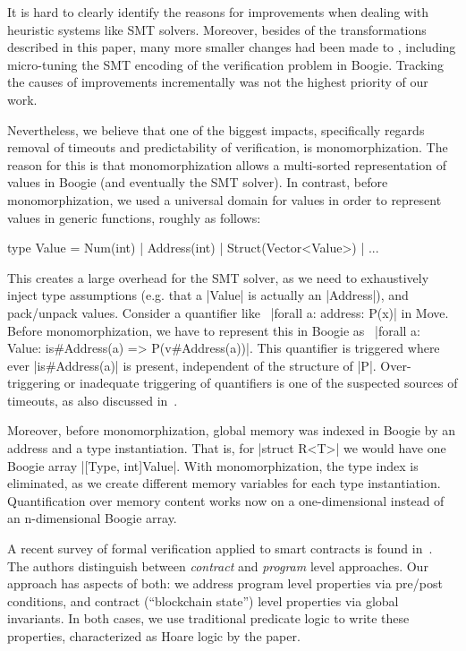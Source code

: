 
It is hard to clearly identify the reasons for improvements when dealing with
heuristic systems like SMT solvers. Moreover, besides of the transformations
described in this paper, many more smaller changes had been made to \MVP,
including micro-tuning the SMT encoding of the verification problem in
Boogie. Tracking the causes of improvements incrementally was not the highest
priority of our work.

Nevertheless, we believe that one of the biggest impacts, specifically regards
removal of timeouts and predictability of verification, is monomorphization. The
reason for this is that monomorphization allows a multi-sorted representation
of values in Boogie (and eventually the SMT solver). In contrast, before
monomorphization, we used a universal domain for values in order to represent
values in generic functions, roughly as follows:

\begin{Move}
  type Value = Num(int) | Address(int) | Struct(Vector<Value>) | ...
\end{Move}

\noindent This creates a large overhead for the SMT solver, as we need to
exhaustively inject type assumptions (e.g. that a |Value| is actually an
|Address|), and pack/unpack values. Consider a quantifier like~%
|forall a: address: P(x)| in Move. Before monomorphization, we have to represent
this in Boogie as~%
|forall a: Value: is#Address(a) => P(v#Address(a))|. This quantifier is
triggered where ever |is#Address(a)| is present, independent of the structure of
|P|. Over-triggering or inadequate triggering of quantifiers is one of the
suspected sources of timeouts, as also discussed in~\cite{BUTTERFLY}.

Moreover, before monomorphization, global memory was indexed in Boogie by an
address and a type instantiation. That is, for |struct R<T>| we would
have one Boogie array |[Type, int]Value|. With monomorphization, the type index
is eliminated, as we create different memory variables for each type
instantiation.  Quantification over memory content works now on a one-dimensional
instead of an n-dimensional Boogie array.


A recent survey of formal verification applied to smart contracts is found
in~\cite{CONTRACT_VERIFICATION}. The authors distinguish between \emph{contract}
and \emph{program} level approaches. Our approach has aspects of both: we
address program level properties via pre/post conditions, and contract
(``blockchain state'') level properties via global invariants. In both cases, we
use traditional predicate logic to write these properties, characterized as
Hoare logic by the paper.

